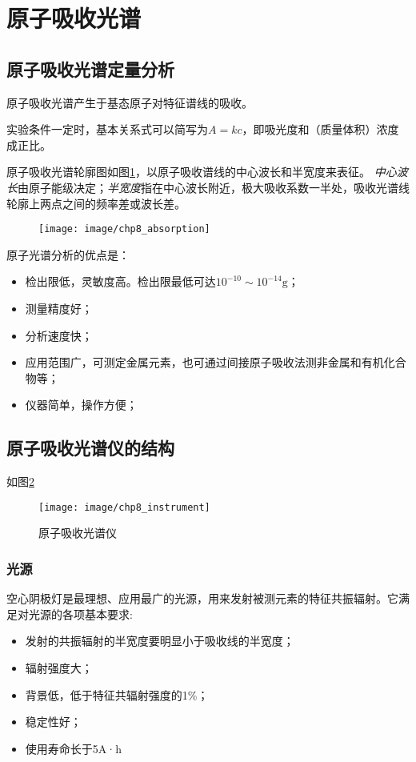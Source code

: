 \section{原子吸收光谱}

\subsection{原子吸收光谱定量分析}
原子吸收光谱产生于基态原子对特征谱线的吸收。

实验条件一定时，基本关系式可以简写为$A=kc$，即吸光度和（质量体积）浓度成正比。

原子吸收光谱轮廓图如图\ref{fig:chp8absorption}，以原子吸收谱线的中心波长和半宽度来表征。
\textit{中心波长}由原子能级决定；\textit{半宽度}指在中心波长附近，极大吸收系数一半处，吸收光谱线轮廓上两点之间的频率差或波长差。

\begin{figure}[!h]
	\centering
	\texttt{[image: image/chp8\_absorption]}
	\caption{}
	\label{fig:chp8absorption}
\end{figure}

原子光谱分析的优点是：
\begin{itemize}
	\item 检出限低，灵敏度高。检出限最低可达$10^{-10}\sim 10^{-14}\mathrm{g}$；
	\item 测量精度好；
	\item 分析速度快；
	\item 应用范围广，可测定金属元素，也可通过间接原子吸收法测非金属和有机化合物等；
	\item 仪器简单，操作方便；
\end{itemize}

\subsection{原子吸收光谱仪的结构}

如图\ref{fig:chp8instrument}
\begin{figure}[!h]
	\centering
	\texttt{[image: image/chp8\_instrument]}
	\caption{原子吸收光谱仪}
	\label{fig:chp8instrument}
\end{figure}

\subsubsection{光源}
空心阴极灯是最理想、应用最广的光源，用来发射被测元素的特征共振辐射。它满足对光源的各项基本要求:
\begin{itemize}
	\item 发射的共振辐射的半宽度要明显小于吸收线的半宽度；
	\item 辐射强度大；
	\item 背景低，低于特征共辐射强度的1\%；
	\item 稳定性好；
	\item 使用寿命长于5A·h
\end{itemize}

